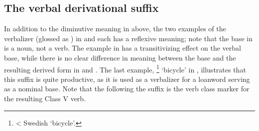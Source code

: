\subsection{The verbal derivational suffix }\label{vblzD}
In addition to the diminutive meaning in  above, 
the two examples of the verbalizer  (glossed as ) in  and  each has a reflexive meaning; note that the base in  is a noun, not a verb. The example in  has a transitivizing effect on the verbal base, while there is no clear difference in meaning between the base and the resulting derived form in  and . The last example, \footnote{< Swedish  ‘bicycle’.} 
‘bicycle’ in , illustrates that this suffix is quite productive, as it is used as a verbalizer for a loanword serving as a nominal base. 
Note that the  following the  suffix is the verb class marker for the resulting Class V verb. 
\ea\label{vblzDex1}
\z
\ea\label{vblzDex2}
\z
\ea\label{vblzDex4}
\z
\ea\label{vblzDex5}
\z
\ea\label{vblzDex5b}
\z
\ea\label{vblzDex6}
\z



